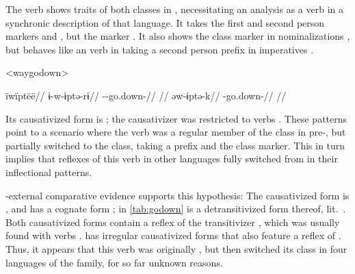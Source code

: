 

The verb shows traits of both classes in \wayana, necessitating an analysis as a  verb in a synchronic description of that language.
It takes the first and second person  markers  and  \parencite[200]{wayanatavares2005}, but the  marker  \parencite[206]{wayanatavares2005}.
It also shows the  class marker  in nominalizations , but behaves like an  verb in taking a second person prefix in imperatives .

\pex<waygodown>\wayana \parencite[][200]{wayanatavares2005}
\begin{multicols}{2}
\begingl
\glpreamble ïwïptëë//
\gla ɨ-w-ɨptə-rɨ//
\glb {}--go.down-//
\glft {}//
\endgl
{}
\begingl
\gla əw-ɨptə-k//
\glb {}-go.down-//
\glft {}//
\endgl
\end{multicols}
\xe
%
Its causativized form is  \parencite[255]{wayanatavares2005}; the \PC  causativizer  was restricted to  verbs \parencite{gildea2019overview}.
These patterns point to a scenario where the verb was a regular member of the  class in pre-\wayana, but partially switched to the  class, taking a  prefix and the  class marker.
This in turn implies that  reflexes of this verb in other languages fully switched from  in their inflectional patterns.

\wayana-external comparative evidence supports this hypothesis:
The \arara causativized form is  \parencite[66]{alves2017arara}, and \kalina has a cognate form  \parencite[263]{courtz2008carib};   in \cref{tab:godown} is a detransitivized form thereof, lit.\ .
Both causativized forms contain a reflex of the transitivizer , which was usually found with  verbs \parencite{gildea2019overview}.
\trio {} has irregular causativized forms that also feature a reflex of  \parencite[263]{triomeira1999}.
Thus, it appears that this verb was originally , but then switched its class in four  languages of the family, for so far unknown reasons.

